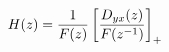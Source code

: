 \documentclass[preview]{standalone}
\begin{document}
\begin{align*}
\special{dvisvgm:raw <g id='unique000'>}H(z)=\frac{1}{F(z)}\left[\frac{D_{yx}(z)}{F(z^{-1})}\right]_{+}\special{dvisvgm:raw </g>}
\end{align*}
\end{document}
